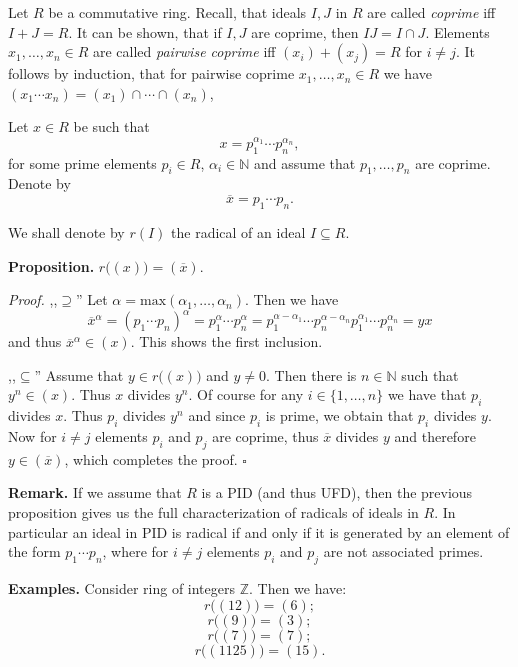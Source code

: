 \documentclass[12pt]{article}
\begin{document}
Let $R$ be a commutative ring. Recall, that ideals $I,J$ in $R$ are called \textit{coprime} iff $I+J=R$. It can be shown, that if $I,J$ are coprime, then $IJ=I\cap J$. Elements $x_1,\ldots,x_n\in R$ are called \textit{pairwise coprime} iff $(x_i)+(x_j)=R$ for $i\neq j$. It follows by induction, that for pairwise coprime $x_1,\ldots,x_n\in R$ we have $(x_1\cdots x_n)=(x_1)\cap\cdots\cap(x_n)$,

Let $x\in R$ be such that $$x=p_1^{\alpha_1}\cdots p_n^{\alpha_n},$$
for some prime elements $p_i\in R$, $\alpha_i\in\mathbb{N}$ and assume that $p_1,\ldots,p_n$ are coprime. Denote by
$$\overline{x}=p_1\cdots p_n.$$

We shall denote by $r(I)$ the radical of an ideal $I\subseteq R$.

\textbf{Proposition.} $r\big((x)\big)=(\overline{x})$.

\textit{Proof.} ,,$\supseteq$'' Let $\alpha=\mathrm{max}(\alpha_1,\ldots,\alpha_n)$. Then we have 
$$\overline{x}^{\alpha}=(p_1\cdots p_n)^{\alpha}=p_1^{\alpha}\cdots p_n^{\alpha}=p_1^{\alpha-\alpha_1}\cdots p_n^{\alpha-\alpha_n}p_1^{\alpha_1}\cdots p_n^{\alpha_n}=yx$$
and thus $\overline{x}^{\alpha}\in (x)$. This shows the first inclusion.

,,$\subseteq$'' Assume that $y\in r\big((x)\big)$ and $y\neq 0$. Then there is $n\in\mathbb{N}$ such that $y^n\in (x)$. Thus $x$ divides $y^n$. Of course for any $i\in\{1,\ldots,n\}$ we have that $p_i$ divides $x$. Thus $p_i$ divides $y^n$ and since $p_i$ is prime, we obtain that $p_i$ divides $y$. Now for $i\neq j$ elements $p_i$ and $p_j$ are coprime, thus $\overline{x}$ divides $y$ and therefore $y\in (\overline{x})$, which completes the proof. $\square$

\textbf{Remark.} If we assume that $R$ is a PID (and thus UFD), then the previous proposition gives us the full characterization of radicals of ideals in $R$. In particular an ideal in PID is radical if and only if it is generated by an element of the form $p_1\cdots p_n$, where for $i\neq j$ elements $p_i$ and $p_j$ are not associated primes.

\textbf{Examples.} Consider ring of integers $\mathbb{Z}$. Then we have:
$$r\big((12)\big)=(6);$$
$$r\big((9)\big)=(3);$$
$$r\big((7)\big)=(7);$$
$$r\big((1125)\big)=(15).$$
\end{document}
